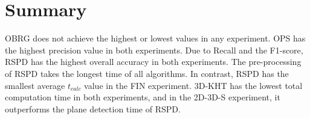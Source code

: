 \documentclass[main.tex]{subfiles}
\begin{document}
\section{Summary}
OBRG does not achieve the highest or lowest values in any experiment.
OPS has the highest precision value in both experiments.
Due to Recall and the F1-score, RSPD has the highest overall accuracy in both experiments.
The pre-processing of RSPD takes the longest time of all algorithms. In contrast, RSPD has the smallest average $t_{calc}$
value in the FIN experiment. 3D-KHT has the lowest total computation time in both experiments, and in the 2D-3D-S experiment,
it outperforms the plane detection time of RSPD.


\end{document}
